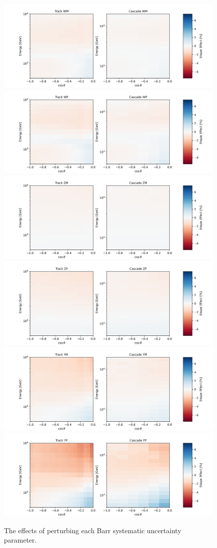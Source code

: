 \documentclass[main.tex]{subfiles}
\begin{document}
\begin{figure}
    \centering
    \includegraphics[width=0.45\linewidth]{./figures/systematics/WM.png}%
    \includegraphics[width=0.45\linewidth]{./figures/systematics/WP.png}
    \includegraphics[width=0.45\linewidth]{./figures/systematics/ZM.png}%
    \includegraphics[width=0.45\linewidth]{./figures/systematics/ZP.png}
    \includegraphics[width=0.45\linewidth]{./figures/systematics/YM.png}%
    \includegraphics[width=0.45\linewidth]{./figures/systematics/YP.png}
    \caption{The effects of perturbing each Barr systematic uncertainty parameter.}\label{fig:bar_effect}
\end{figure}
\end{document}

